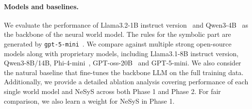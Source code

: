 \documentclass{article}
\theoremstyle{plain}
\theoremstyle{definition}
\theoremstyle{remark}
\newcommand{\ours}{{\sc NeSyS}\xspace}
\begin{document}
\paragraph{Models and baselines.} We evaluate the performance of Llama3.2-1B instruct version~\citep{grattafiori2024llama} and Qwen3-4B~\citep{qwen2, qwen2.5} as the backbone of the neural world model. The rules for the symbolic part are generated by \texttt{gpt-5-mini}~\citep{singh2025openai}. We compare against multiple strong open-source models along with proprietary models, including Llama3.1-8B instruct version, Qwen3-8B/14B, Phi-4-mini~\citep{abouelenin2025phi}, GPT-oss-20B~\citep{agarwal2025gpt} and GPT-5-mini. We also consider the natural baseline that fine-tunes the backbone LLM on the full training data. Additionally, we provide a detailed ablation analysis covering performance of each single world model and \ours across both Phase 1 and Phase 2. For fair comparison, we also learn a weight for \ours in Phase 1.
\end{document}
